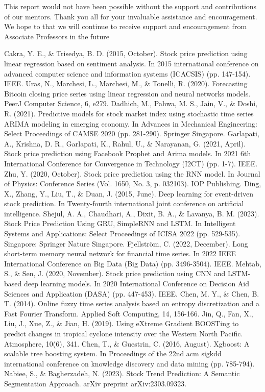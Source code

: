 \documentclass{ieeeojies}
\begin{document}
This report would not have been possible without the
 support and contributions of our mentors. Thank you all for your invaluable assistance and
 encouragement. We hope to that we will continue to receive support and encouragement from Associate Professors in the future
\begin{thebibliography}{00}
Cakra, Y. E., \& Trisedya, B. D. (2015, October). Stock price prediction using linear regression based on sentiment analysis. In 2015 international conference on advanced computer science and information systems (ICACSIS) (pp. 147-154). IEEE.
Uras, N., Marchesi, L., Marchesi, M., \& Tonelli, R. (2020). Forecasting Bitcoin closing price series using linear regression and neural networks models. PeerJ Computer Science, 6, e279.
Dadhich, M., Pahwa, M. S., Jain, V., \& Doshi, R. (2021). Predictive models for stock market index using stochastic time series ARIMA modeling in emerging economy. In Advances in Mechanical Engineering: Select Proceedings of CAMSE 2020 (pp. 281-290). Springer Singapore.
Garlapati, A., Krishna, D. R., Garlapati, K., Rahul, U., \& Narayanan, G. (2021, April). Stock price prediction using Facebook Prophet and Arima models. In 2021 6th International Conference for Convergence in Technology (I2CT) (pp. 1-7). IEEE.
Zhu, Y. (2020, October). Stock price prediction using the RNN model. In Journal of Physics: Conference Series (Vol. 1650, No. 3, p. 032103). IOP Publishing.
Ding, X., Zhang, Y., Liu, T., \& Duan, J. (2015, June). Deep learning for event-driven stock prediction. In Twenty-fourth international joint conference on artificial intelligence.
Shejul, A. A., Chaudhari, A., Dixit, B. A., \& Lavanya, B. M. (2023). Stock Price Prediction Using GRU, SimpleRNN and LSTM. In Intelligent Systems and Applications: Select Proceedings of ICISA 2022 (pp. 529-535). Singapore: Springer Nature Singapore.
Fjellström, C. (2022, December). Long short-term memory neural network for financial time series. In 2022 IEEE International Conference on Big Data (Big Data) (pp. 3496-3504). IEEE.
Mehtab, S., \& Sen, J. (2020, November). Stock price prediction using CNN and LSTM-based deep learning models. In 2020 International Conference on Decision Aid Sciences and Application (DASA) (pp. 447-453). IEEE.
Chen, M. Y., \& Chen, B. T. (2014). Online fuzzy time series analysis based on entropy discretization and a Fast Fourier Transform. Applied Soft Computing, 14, 156-166.
Jin, Q., Fan, X., Liu, J., Xue, Z., \& Jian, H. (2019). Using eXtreme Gradient BOOSTing to predict changes in tropical cyclone intensity over the Western North Pacific. Atmosphere, 10(6), 341.
Chen, T., \& Guestrin, C. (2016, August). Xgboost: A scalable tree boosting system. In Proceedings of the 22nd acm sigkdd international conference on knowledge discovery and data mining (pp. 785-794).
Nabiee, S., \& Bagherzadeh, N. (2023). Stock Trend Prediction: A Semantic Segmentation Approach. arXiv preprint arXiv:2303.09323.



\end{thebibliography}
\end{document}
